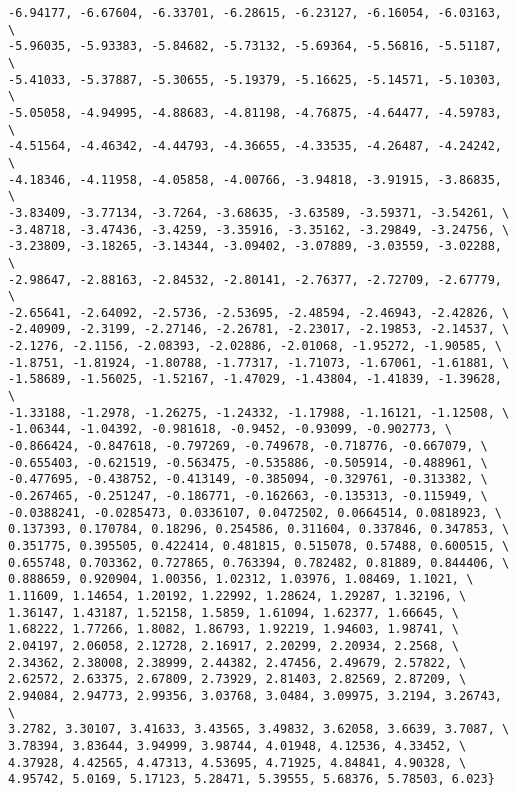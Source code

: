 \documentclass[%
 showpacs,
 showkeys,
 preprintnumbers,
 amsmath,amssymb,
 aps,
  pra,
  longbibliography,
 floatfix,
 ]{revtex4-1}
\begin{document}
{\begin{lstlisting}[backgroundcolor=\color{yellow!10},framerule=0pt,breaklines=true, frame=tb]
-6.94177, -6.67604, -6.33701, -6.28615, -6.23127, -6.16054, -6.03163, \
-5.96035, -5.93383, -5.84682, -5.73132, -5.69364, -5.56816, -5.51187, \
-5.41033, -5.37887, -5.30655, -5.19379, -5.16625, -5.14571, -5.10303, \
-5.05058, -4.94995, -4.88683, -4.81198, -4.76875, -4.64477, -4.59783, \
-4.51564, -4.46342, -4.44793, -4.36655, -4.33535, -4.26487, -4.24242, \
-4.18346, -4.11958, -4.05858, -4.00766, -3.94818, -3.91915, -3.86835, \
-3.83409, -3.77134, -3.7264, -3.68635, -3.63589, -3.59371, -3.54261, \
-3.48718, -3.47436, -3.4259, -3.35916, -3.35162, -3.29849, -3.24756, \
-3.23809, -3.18265, -3.14344, -3.09402, -3.07889, -3.03559, -3.02288, \
-2.98647, -2.88163, -2.84532, -2.80141, -2.76377, -2.72709, -2.67779, \
-2.65641, -2.64092, -2.5736, -2.53695, -2.48594, -2.46943, -2.42826, \
-2.40909, -2.3199, -2.27146, -2.26781, -2.23017, -2.19853, -2.14537, \
-2.1276, -2.1156, -2.08393, -2.02886, -2.01068, -1.95272, -1.90585, \
-1.8751, -1.81924, -1.80788, -1.77317, -1.71073, -1.67061, -1.61881, \
-1.58689, -1.56025, -1.52167, -1.47029, -1.43804, -1.41839, -1.39628, \
-1.33188, -1.2978, -1.26275, -1.24332, -1.17988, -1.16121, -1.12508, \
-1.06344, -1.04392, -0.981618, -0.9452, -0.93099, -0.902773, \
-0.866424, -0.847618, -0.797269, -0.749678, -0.718776, -0.667079, \
-0.655403, -0.621519, -0.563475, -0.535886, -0.505914, -0.488961, \
-0.477695, -0.438752, -0.413149, -0.385094, -0.329761, -0.313382, \
-0.267465, -0.251247, -0.186771, -0.162663, -0.135313, -0.115949, \
-0.0388241, -0.0285473, 0.0336107, 0.0472502, 0.0664514, 0.0818923, \
0.137393, 0.170784, 0.18296, 0.254586, 0.311604, 0.337846, 0.347853, \
0.351775, 0.395505, 0.422414, 0.481815, 0.515078, 0.57488, 0.600515, \
0.655748, 0.703362, 0.727865, 0.763394, 0.782482, 0.81889, 0.844406, \
0.888659, 0.920904, 1.00356, 1.02312, 1.03976, 1.08469, 1.1021, \
1.11609, 1.14654, 1.20192, 1.22992, 1.28624, 1.29287, 1.32196, \
1.36147, 1.43187, 1.52158, 1.5859, 1.61094, 1.62377, 1.66645, \
1.68222, 1.77266, 1.8082, 1.86793, 1.92219, 1.94603, 1.98741, \
2.04197, 2.06058, 2.12728, 2.16917, 2.20299, 2.20934, 2.2568, \
2.34362, 2.38008, 2.38999, 2.44382, 2.47456, 2.49679, 2.57822, \
2.62572, 2.63375, 2.67809, 2.73929, 2.81403, 2.82569, 2.87209, \
2.94084, 2.94773, 2.99356, 3.03768, 3.0484, 3.09975, 3.2194, 3.26743, \
3.2782, 3.30107, 3.41633, 3.43565, 3.49832, 3.62058, 3.6639, 3.7087, \
3.78394, 3.83644, 3.94999, 3.98744, 4.01948, 4.12536, 4.33452, \
4.37928, 4.42565, 4.47313, 4.53695, 4.71925, 4.84841, 4.90328, \
4.95742, 5.0169, 5.17123, 5.28471, 5.39555, 5.68376, 5.78503, 6.023}

\end{lstlisting}  }


 
 
\end{document}
